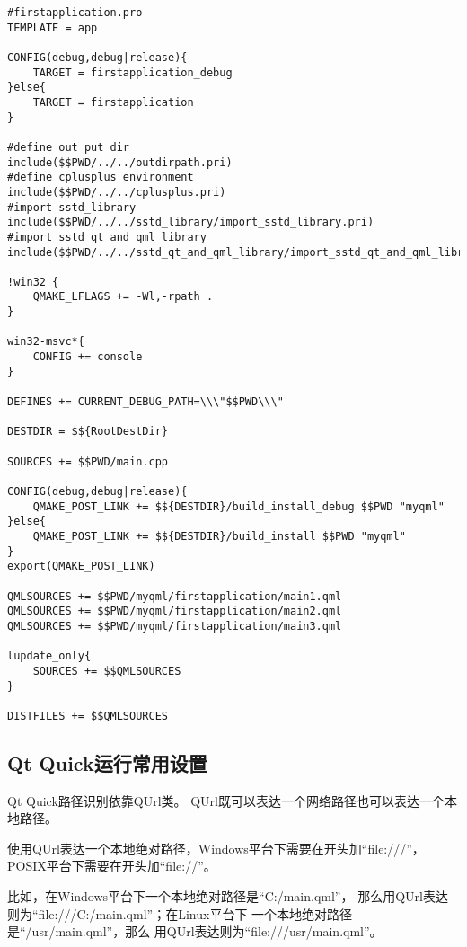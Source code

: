 \FloatBarrier
\begin{lstlisting}[label=f000019,
caption=GoodLuck,
title=\lstlistingname\ \thelstlisting\marginnote{\fbox{\footnotesize{\lstlistingname\ \thelstlisting}}}
]
#firstapplication.pro
TEMPLATE = app

CONFIG(debug,debug|release){
    TARGET = firstapplication_debug
}else{
    TARGET = firstapplication
}

#define out put dir
include($$PWD/../../outdirpath.pri)
#define cplusplus environment
include($$PWD/../../cplusplus.pri)
#import sstd_library
include($$PWD/../../sstd_library/import_sstd_library.pri)
#import sstd_qt_and_qml_library
include($$PWD/../../sstd_qt_and_qml_library/import_sstd_qt_and_qml_library.pri)

!win32 {
    QMAKE_LFLAGS += -Wl,-rpath .
}

win32-msvc*{
    CONFIG += console
}

DEFINES += CURRENT_DEBUG_PATH=\\\"$$PWD\\\"

DESTDIR = $${RootDestDir}

SOURCES += $$PWD/main.cpp

CONFIG(debug,debug|release){
    QMAKE_POST_LINK += $${DESTDIR}/build_install_debug $$PWD "myqml"
}else{
    QMAKE_POST_LINK += $${DESTDIR}/build_install $$PWD "myqml"
}
export(QMAKE_POST_LINK)

QMLSOURCES += $$PWD/myqml/firstapplication/main1.qml
QMLSOURCES += $$PWD/myqml/firstapplication/main2.qml
QMLSOURCES += $$PWD/myqml/firstapplication/main3.qml

lupdate_only{
    SOURCES += $$QMLSOURCES
}

DISTFILES += $$QMLSOURCES
\end{lstlisting}          %


\FloatBarrier
\subsection{
Qt Quick运行常用设置
}\label{ss001v10}


Qt Quick路径识别依靠QUrl类。
QUrl既可以表达一个网络路径也可以表达一个本地路径。

使用QUrl表达一个本地绝对路径，Windows平台下需要在开头加“file:///”，
POSIX平台下需要在开头加“file://”。

比如，在Windows平台下一个本地绝对路径是“C:/main.qml”，
那么用QUrl表达则为“file:///C:/main.qml”；在Linux平台下
一个本地绝对路径是“/usr/main.qml”，那么
用QUrl表达则为“file:///usr/main.qml”。

